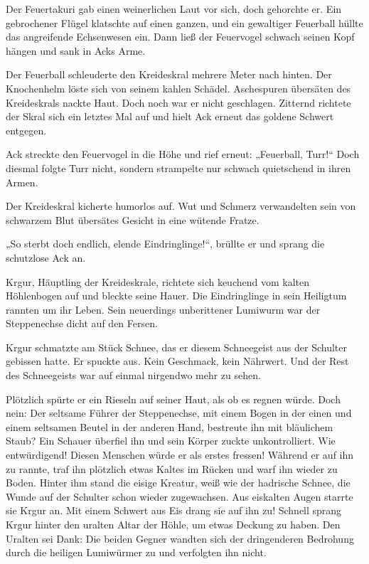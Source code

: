 Der Feuertakuri gab einen weinerlichen Laut vor sich, doch gehorchte er. Ein gebrochener Flügel klatschte auf einen ganzen, und ein gewaltiger Feuerball hüllte das angreifende Echsenwesen ein. Dann ließ der Feuervogel schwach seinen Kopf hängen und sank in Acks Arme.

Der Feuerball schleuderte den Kreideskral mehrere Meter nach hinten. Der Knochenhelm löste sich von seinem kahlen Schädel. Aschespuren übersäten des Kreideskrals nackte Haut. Doch noch war er nicht geschlagen. Zitternd richtete der Skral sich ein letztes Mal auf und hielt Ack erneut das goldene Schwert entgegen.

Ack streckte den Feuervogel in die Höhe und rief erneut: „Feuerball, Turr!“ Doch diesmal folgte Turr nicht, sondern strampelte nur schwach quietschend in ihren Armen.

Der Kreideskral kicherte humorlos auf. Wut und Schmerz verwandelten sein von schwarzem Blut übersätes Gesicht in eine wütende Fratze.

„So sterbt doch endlich, elende Eindringlinge!“, brüllte er und sprang die schutzlose Ack an.



\trennzeichen



Krgur, Häuptling der Kreideskrale, richtete sich keuchend vom kalten Höhlenbogen auf und bleckte seine Hauer. Die Eindringlinge in sein Heiligtum rannten um ihr Leben. Sein neuerdings unberittener Lumiwurm war der Steppenechse dicht auf den Fersen.

Krgur schmatzte am Stück Schnee, das er diesem Schneegeist aus der Schulter gebissen hatte. Er spuckte aus. Kein Geschmack, kein Nährwert. Und der Rest des Schneegeists war auf einmal nirgendwo mehr zu sehen.

Plötzlich spürte er ein Rieseln auf seiner Haut, als ob es regnen würde. Doch nein: Der seltsame Führer der Steppenechse, mit einem Bogen in der einen und einem seltsamen Beutel in der anderen Hand, bestreute ihn mit bläulichem Staub? Ein Schauer überfiel ihn und sein Körper zuckte unkontrolliert. Wie entwürdigend! Diesen Menschen würde er als erstes fressen! Während er auf ihn zu rannte, traf ihn plötzlich etwas Kaltes im Rücken und warf ihn wieder zu Boden. Hinter ihm stand die eisige Kreatur, weiß wie der hadrische Schnee, die Wunde auf der Schulter schon wieder zugewachsen. Aus eiskalten Augen starrte sie Krgur an. Mit einem Schwert aus Eis drang sie auf ihn zu! Schnell sprang Krgur hinter den uralten Altar der Höhle, um etwas Deckung zu haben. Den Uralten sei Dank: Die beiden Gegner wandten sich der dringenderen Bedrohung durch die heiligen Lumiwürmer zu und verfolgten ihn nicht.

